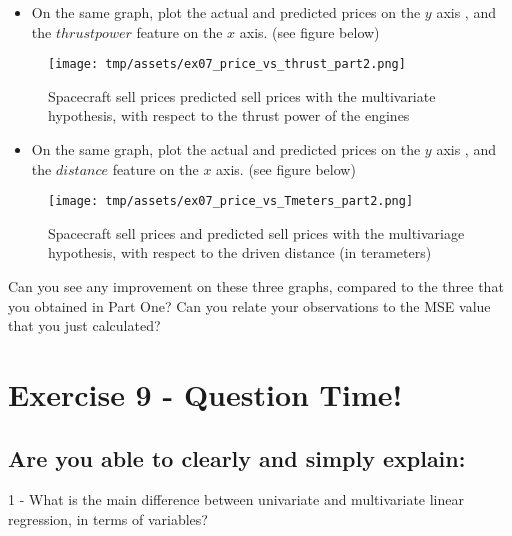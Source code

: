 \documentclass[]{article}
\providecommand{\tightlist}{%
  \setlength{\itemsep}{0pt}\setlength{\parskip}{0pt}}
\begin{document}
\begin{itemize}
\tightlist
\item
  On the same graph, plot the actual and predicted prices on the \(y\)
  axis , and the \(thrust power\) feature on the \(x\) axis. (see figure
  below)
\end{itemize}

\begin{figure}
\centering
\texttt{[image: tmp/assets/ex07\_price\_vs\_thrust\_part2.png]}
\caption{Spacecraft sell prices predicted sell prices with the
multivariate hypothesis, with respect to the thrust power of the
engines}
\end{figure}

\begin{itemize}
\tightlist
\item
  On the same graph, plot the actual and predicted prices on the \(y\)
  axis , and the \(distance\) feature on the \(x\) axis. (see figure
  below)
\end{itemize}

\begin{figure}
\centering
\texttt{[image: tmp/assets/ex07\_price\_vs\_Tmeters\_part2.png]}
\caption{Spacecraft sell prices and predicted sell prices with the
multivariage hypothesis, with respect to the driven distance (in
terameters)}
\end{figure}

Can you see any improvement on these three graphs, compared to the three
that you obtained in Part One? Can you relate your observations to the
MSE value that you just calculated?

\clearpage

\hypertarget{exercise-9---question-time-1}{%
\section{Exercise 9 - Question
Time!}\label{exercise-9---question-time-1}}

\hypertarget{are-you-able-to-clearly-and-simply-explain-1}{%
\subsection{Are you able to clearly and simply
explain:}\label{are-you-able-to-clearly-and-simply-explain-1}}

1 - What is the main difference between univariate and multivariate
linear regression, in terms of variables?
\end{document}
